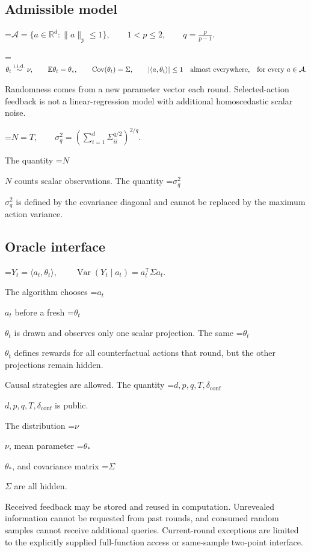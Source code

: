 \documentclass[10pt,a4paper]{article}
\newcommand{\AtlasMath}[1]{\par\begingroup\centering\setbox0=\hbox{$\displaystyle #1$}\ifdim\wd0>1.4\linewidth\typeout{ATLAS WIDE FORMULA: \the\wd0}\fi\ifdim\wd0>\linewidth\resizebox{\linewidth}{!}{\box0}\else\box0\fi\par\endgroup}
\newcommand{\AtlasInlineMath}[1]{\begingroup\setbox0=\hbox{$#1$}\ifdim\wd0>.4\linewidth\endgroup\AtlasMath{#1}\else\endgroup$#1$\fi}
\begin{document}
\subsection{Admissible model}

\AtlasMath{\mathcal{A}=\{a\in\mathbb{R}^d:\|a\|_p\le1\},\qquad 1<p\le2,\qquad q=\frac{p}{p-1}.}



\AtlasMath{\theta_t\overset{\mathrm{i.i.d.}}\sim\nu,\qquad \mathbb{E}\theta_t=\theta_*,\qquad \operatorname{Cov}(\theta_t)=\Sigma,\qquad |\langle a,\theta_t\rangle|\le1\quad\text{\text{almost everywhere},\quad \text{for every} }a\in\mathcal{A}.}


Randomness comes from a new parameter vector each round. Selected-action feedback is not a linear-regression model with additional homoscedastic scalar noise.


\AtlasMath{N=T,\qquad \sigma_q^2=\left(\sum_{i=1}^{d}\Sigma_{ii}^{q/2}\right)^{2/q}.}


The quantity \AtlasInlineMath{N} counts scalar observations. The quantity \AtlasInlineMath{\sigma_q^2} is defined by the covariance diagonal and cannot be replaced by the maximum action variance.

\subsection{Oracle interface}

\AtlasMath{Y_t=\langle a_t,\theta_t\rangle,\qquad \operatorname{Var}(Y_t\mid a_t)=a_t^{\mathsf T}\Sigma a_t.}


The algorithm chooses \AtlasInlineMath{a_t} before a fresh \AtlasInlineMath{\theta_t} is drawn and observes only one scalar projection. The same \AtlasInlineMath{\theta_t} defines rewards for all counterfactual actions that round, but the other projections remain hidden.

Causal strategies are allowed. The quantity \AtlasInlineMath{d,p,q,T,\delta_{\mathrm{conf}}} is public.

The distribution \AtlasInlineMath{\nu}, mean parameter \AtlasInlineMath{\theta_*}, and covariance matrix \AtlasInlineMath{\Sigma} are all hidden.

Received feedback may be stored and reused in computation. Unrevealed information cannot be requested from past rounds, and consumed random samples cannot receive additional queries. Current-round exceptions are limited to the explicitly supplied full-function access or same-sample two-point interface.
\end{document}
